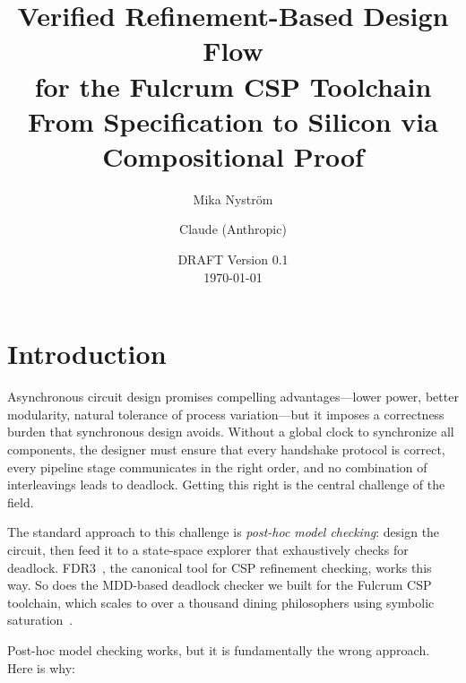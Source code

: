 \documentclass[11pt]{article}
\title{\textbf{Verified Refinement-Based Design Flow \\
for the Fulcrum CSP Toolchain} \\[0.5em]
\large From Specification to Silicon via Compositional Proof}
\author{Mika Nystr\"om \and Claude (Anthropic)}
\date{DRAFT Version 0.1\\
\today}
\begin{document}
\maketitle

\tableofcontents
\newpage

\section{Introduction}
\label{sec:intro}

Asynchronous circuit design promises compelling advantages---lower
power, better modularity, natural tolerance of process variation---but
it imposes a correctness burden that synchronous design avoids.
Without a global clock to synchronize all components, the designer
must ensure that every handshake protocol is correct, every pipeline
stage communicates in the right order, and no combination of
interleavings leads to deadlock.  Getting this right is the central
challenge of the field.

The standard approach to this challenge is \emph{post-hoc model
checking}: design the circuit, then feed it to a state-space explorer
that exhaustively checks for deadlock.  FDR3~\cite{fdr4}, the
canonical tool for CSP refinement checking, works this way.  So does
the MDD-based deadlock checker we built for the Fulcrum CSP toolchain,
which scales to over a thousand dining philosophers using symbolic
saturation~\cite{fv-report}.

Post-hoc model checking works, but it is fundamentally the wrong
approach.  Here is why:
\end{document}
